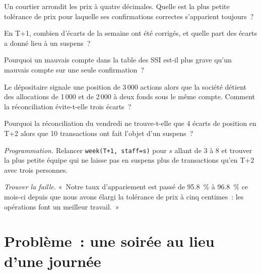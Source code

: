 \begin{exercise}[$\star$]\label{exo:pl:post-trade-systems:2}
Un courtier arrondit les prix à quatre décimales. Quelle est la plus petite tolérance de prix pour laquelle ses confirmations correctes s'apparient toujours~?
\end{exercise}

\begin{exercise}[$\star$]\label{exo:pl:post-trade-systems:3}
En T+1, combien d'écarts de la semaine ont été corrigés, et quelle part des écarts a donné lieu à un suspens~?
\end{exercise}

\begin{exercise}[$\star\star$]\label{exo:pl:post-trade-systems:4}
Pourquoi un mauvais compte dans la table des SSI est-il plus grave qu'un mauvais compte sur une seule confirmation~?
\end{exercise}

\begin{exercise}[$\star\star$]\label{exo:pl:post-trade-systems:5}
Le dépositaire signale une position de 3\,000 actions alors que la société détient des allocations de 1\,000 et de 2\,000 à deux fonds sous le même compte.
Comment la réconciliation évite-t-elle trois écarts~?
\end{exercise}

\begin{exercise}[$\star\star$]\label{exo:pl:post-trade-systems:6}
Pourquoi la réconciliation du vendredi ne trouve-t-elle que 4 écarts de position en T+2 alors que 10 transactions ont fait l'objet d'un suspens~?
\end{exercise}

\begin{exercise}[$\star\star\star$]\label{exo:pl:post-trade-systems:7}
\emph{Programmation.} Relancer \texttt{week(\textquotedbl T+1\textquotedbl, staff=s)} pour $s$ allant de 3 à 8 et trouver la plus petite équipe qui ne laisse pas en suspens plus de
transactions qu'en T+2 avec trois personnes.
\end{exercise}

\begin{exercise}[$\star\star\star$]\label{exo:pl:post-trade-systems:8}
\emph{Trouver la faille.} «~Notre taux d'appariement est passé de 95.8~\% à 96.8~\% ce mois-ci depuis que nous avons élargi la tolérance de prix à cinq centimes~:
les opérations font un meilleur travail.~»
\end{exercise}

\section{Problème~: une soirée au lieu d'une journée}

